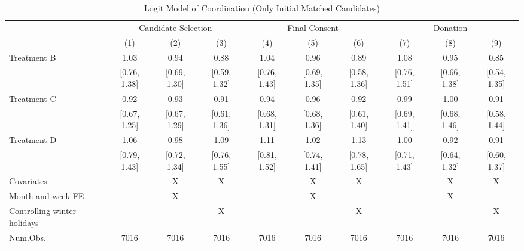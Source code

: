 \documentclass[12pt, a4paper]{article}
\begin{document}
\begin{landscape}\begin{table}[H]

\caption{\label{tab:logit-coordinate-initial-matched}Logit Model of Coordination (Only Initial Matched Candidates)}
\centering
\fontsize{8}{10}\selectfont
\begin{threeparttable}
\begin{tabular}[t]{lccccccccc}
\toprule
\multicolumn{1}{c}{ } & \multicolumn{3}{c}{Candidate Selection} & \multicolumn{3}{c}{Final Consent} & \multicolumn{3}{c}{Donation} \\
\cmidrule(l{3pt}r{3pt}){2-4} \cmidrule(l{3pt}r{3pt}){5-7} \cmidrule(l{3pt}r{3pt}){8-10}
  & (1) & (2) & (3) & (4) & (5) & (6) & (7) & (8) & (9)\\
\midrule
Treatment B & \num{1.03} & \num{0.94} & \num{0.88} & \num{1.04} & \num{0.96} & \num{0.89} & \num{1.08} & \num{0.95} & \num{0.85}\\
 & {}[\num{0.76}, \num{1.38}] & {}[\num{0.69}, \num{1.30}] & {}[\num{0.59}, \num{1.32}] & {}[\num{0.76}, \num{1.43}] & {}[\num{0.69}, \num{1.35}] & {}[\num{0.58}, \num{1.36}] & {}[\num{0.76}, \num{1.51}] & {}[\num{0.66}, \num{1.38}] & {}[\num{0.54}, \num{1.35}]\\
Treatment C & \num{0.92} & \num{0.93} & \num{0.91} & \num{0.94} & \num{0.96} & \num{0.92} & \num{0.99} & \num{1.00} & \num{0.91}\\
 & {}[\num{0.67}, \num{1.25}] & {}[\num{0.67}, \num{1.29}] & {}[\num{0.61}, \num{1.36}] & {}[\num{0.68}, \num{1.31}] & {}[\num{0.68}, \num{1.36}] & {}[\num{0.61}, \num{1.40}] & {}[\num{0.69}, \num{1.41}] & {}[\num{0.68}, \num{1.46}] & {}[\num{0.58}, \num{1.44}]\\
Treatment D & \num{1.06} & \num{0.98} & \num{1.09} & \num{1.11} & \num{1.02} & \num{1.13} & \num{1.00} & \num{0.92} & \num{0.91}\\
 & {}[\num{0.79}, \num{1.43}] & {}[\num{0.72}, \num{1.34}] & {}[\num{0.76}, \num{1.55}] & {}[\num{0.81}, \num{1.52}] & {}[\num{0.74}, \num{1.41}] & {}[\num{0.78}, \num{1.65}] & {}[\num{0.71}, \num{1.43}] & {}[\num{0.64}, \num{1.32}] & {}[\num{0.60}, \num{1.37}]\\
\midrule
Covariates &  & X & X &  & X & X &  & X & X\\
Month and week FE &  & X &  &  & X &  &  & X & \\
Controlling winter holidays &  &  & X &  &  & X &  &  & X\\
Num.Obs. & \num{7016} & \num{7016} & \num{7016} & \num{7016} & \num{7016} & \num{7016} & \num{7016} & \num{7016} & \num{7016}\\

\end{tabular}
\end{threeparttable}
\end{table}
\end{landscape}
\end{document}
